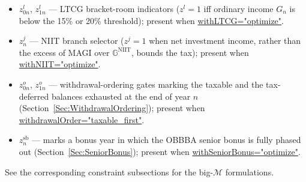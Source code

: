 \documentclass[fleqn,12pt]{report}
\newcommand{\code}[1]{\url{#1}}
\begin{document}
\begin{description}[leftmargin=4em,style=multiline]
\begin{itemize}[nosep]
	    operations in the SS taxability MIP; present when
	    \code{withSSTaxability="optimize"}.
	  \item $z^l_{0n}$, $z^l_{1n}$ --- LTCG bracket-room indicators ($z^l=1$ iff
	    ordinary income $G_n$ is below the 15\% or 20\% threshold); present when
	    \code{withLTCG="optimize"}.
	  \item $z^j_n$ --- NIIT branch selector ($z^j=1$ when net investment income,
	    rather than the excess of MAGI over $\mathbb{G}^{\mathrm{NIIT}}$, bounds the tax);
	    present when \code{withNIIT="optimize"}.
	  \item $z^o_{0n}$, $z^o_{1n}$ --- withdrawal-ordering gates marking the taxable and the
	    tax-deferred balances exhausted at the end of year $n$
	    (Section~\ref{Sec:WithdrawalOrdering}); present when
	    \code{withdrawalOrder="taxable_first"}.
	  \item $z^{\mathrm{sb}}_n$ --- marks a bonus year in which the OBBBA senior bonus is fully
	    phased out (Section~\ref{Sec:SeniorBonus}); present when
	    \code{withSeniorBonus="optimize"}.
	\end{itemize}
	See the corresponding constraint subsections for the big-$\mathcal{M}$ formulations.
\end{description}
\end{document}
